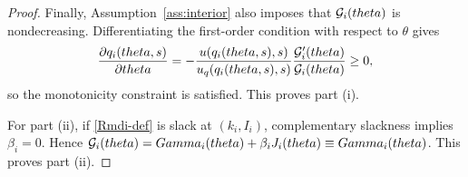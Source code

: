 \documentclass[master.tex]{subfiles}
\begin{document}
\begin{proof}
Finally, Assumption~\ref{ass:interior} also imposes that \(\mathcal{G}_i(theta)\) is nondecreasing. Differentiating the first-order condition with respect to \(\theta\) gives
\[
\frac{\partial q_i(theta,s)}{\partial theta}
=
-
\frac{u\!\left(q_i(theta,s),s\right)}{u_q\!\left(q_i(theta,s),s\right)}
\frac{\mathcal{G}_i'(theta)}{\mathcal{G}_i(theta)}
\ge 0,
\]
so the monotonicity constraint is satisfied. This proves part (i).

For part (ii), if \eqref{Rmdi-def} is slack at \((k_i,I_i)\), complementary slackness implies \(\beta_i=0\). Hence $\mathcal{G}_i(theta)=Gamma_i(theta)+\beta_i J_i(theta)\equiv Gamma_i(theta)$. This proves part (ii).
\end{proof}


\end{document}
